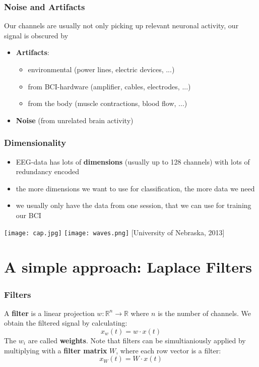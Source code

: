 \documentclass{beamer}
\begin{document}
\begin{frame}
\frametitle{Noise and Artifacts}
Our channels are usually not only picking up relevant neuronal activity, our signal is obscured by
	\begin{itemize}
	\item {\bf Artifacts}: 
	\begin{itemize}
	\item environmental (power lines, electric devices, ...)
	\item from BCI-hardware (amplifier, cables, electrodes, ...)
	\item from the body (muscle contractions, blood flow, ...)
	\end{itemize}
	\item {\bf Noise} (from unrelated brain activity)
	\end{itemize}
\end{frame}

\begin{frame}
\frametitle{Dimensionality}
	\begin{itemize}
	\item EEG-data has lots of {\bf dimensions} (usually up to 128 channels) with lots of redundancy encoded
	\item the more dimensions we want to use for classification, the more data we need
	\item we usually only have the data from one session, that we can use for training our BCI
	\end{itemize}
	\texttt{[image: cap.jpg]}
	\texttt{[image: waves.png]}
	{\tiny [University of Nebraska, 2013]}	
\end{frame}


\section{A simple approach: Laplace Filters}


\begin{frame}
	\frametitle{Filters}
	\begin{definition}
	A {\bf filter} is a linear projection $w: \mathds{R}^n \rightarrow \mathds{R}$ where $n$ is the number of channels. We obtain the 
	filtered signal by calculating:
	\begin{equation}
		x_w(t) = w \cdot x(t)
	\end{equation}
	The $w_i$ are called {\bf weights}. Note that filters can be simultianiously applied by multiplying with a 			{\bf filter matrix} $W$, where each row vector is a filter:
	\begin{equation}
		x_W(t) = W \cdot x(t)
	\end{equation} 
	\end{definition}
\end{frame}
\end{document}
